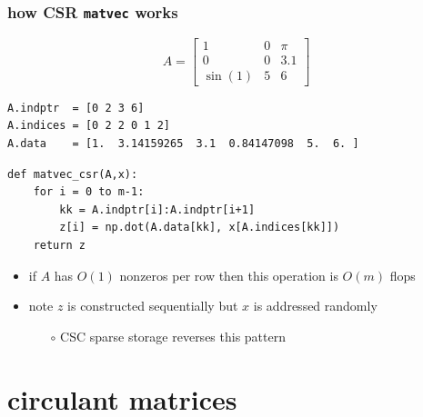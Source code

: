 \documentclass[10pt,
               svgnames,
               hyperref={colorlinks,citecolor=DeepPink4,linkcolor=FireBrick,urlcolor=Maroon},
               usepdftitle=false]{beamer}
\begin{document}
\begin{frame}[fragile]
\frametitle{how CSR \texttt{matvec} works}

$$A = \begin{bmatrix} 1 & 0 & \pi \\ 0 & 0 & 3.1 \\ \sin(1) & 5 & 6 \end{bmatrix}$$

\bigskip
\begin{verbatim}
A.indptr  = [0 2 3 6]
A.indices = [0 2 2 0 1 2]
A.data    = [1.  3.14159265  3.1  0.84147098  5.  6. ]
\end{verbatim}

\bigskip
\begin{center}
\begin{minipage}{0.7\textwidth}
\begin{verbatim}
def matvec_csr(A,x):
    for i = 0 to m-1:
        kk = A.indptr[i]:A.indptr[i+1]
        z[i] = np.dot(A.data[kk], x[A.indices[kk]])
    return z
\end{verbatim}
\end{minipage}
\end{center}

\begin{itemize}
\item if $A$ has $O(1)$ nonzeros per row then this operation is $O(m)$ flops
\item note $z$ is constructed sequentially but $x$ is addressed randomly
   \begin{itemize}
   \item[$\circ$] CSC sparse storage reverses this pattern
   \end{itemize}
\end{itemize}
\end{frame}


%
%
%


\section{circulant matrices}
\end{document}

